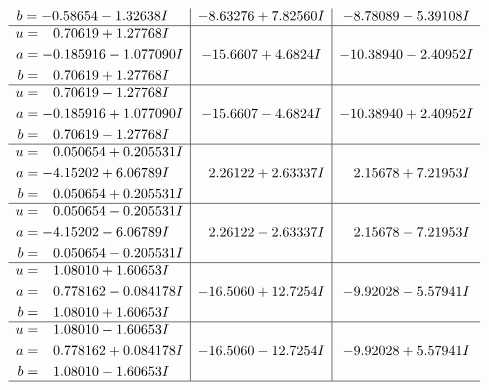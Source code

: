 \documentclass[1p]{elsarticle_modified}
\theoremstyle{definition}
\begin{document}
$$\begin{array}{c|c|c}
\begin{aligned}
b &= -0.58654 - 1.32638 I\end{aligned}
 & -8.63276 + 7.82560 I & -8.78089 - 5.39108 I \\ \hline\begin{aligned}
u &= \phantom{-}0.70619 + 1.27768 I \\
a &= -0.185916 - 1.077090 I \\
b &= \phantom{-}0.70619 + 1.27768 I\end{aligned}
 & -15.6607 + 4.6824 I & -10.38940 - 2.40952 I \\ \hline\begin{aligned}
u &= \phantom{-}0.70619 - 1.27768 I \\
a &= -0.185916 + 1.077090 I \\
b &= \phantom{-}0.70619 - 1.27768 I\end{aligned}
 & -15.6607 - 4.6824 I & -10.38940 + 2.40952 I \\ \hline\begin{aligned}
u &= \phantom{-}0.050654 + 0.205531 I \\
a &= -4.15202 + 6.06789 I \\
b &= \phantom{-}0.050654 + 0.205531 I\end{aligned}
 & \phantom{-}2.26122 + 2.63337 I & \phantom{-}2.15678 + 7.21953 I \\ \hline\begin{aligned}
u &= \phantom{-}0.050654 - 0.205531 I \\
a &= -4.15202 - 6.06789 I \\
b &= \phantom{-}0.050654 - 0.205531 I\end{aligned}
 & \phantom{-}2.26122 - 2.63337 I & \phantom{-}2.15678 - 7.21953 I \\ \hline\begin{aligned}
u &= \phantom{-}1.08010 + 1.60653 I \\
a &= \phantom{-}0.778162 - 0.084178 I \\
b &= \phantom{-}1.08010 + 1.60653 I\end{aligned}
 & -16.5060 + 12.7254 I & -9.92028 - 5.57941 I \\ \hline\begin{aligned}
u &= \phantom{-}1.08010 - 1.60653 I \\
a &= \phantom{-}0.778162 + 0.084178 I \\
b &= \phantom{-}1.08010 - 1.60653 I\end{aligned}
 & -16.5060 - 12.7254 I & -9.92028 + 5.57941 I\\
 \hline 
 \end{array}$$\newpage\newpage\renewcommand{\arraystretch}{1}
\end{document}

